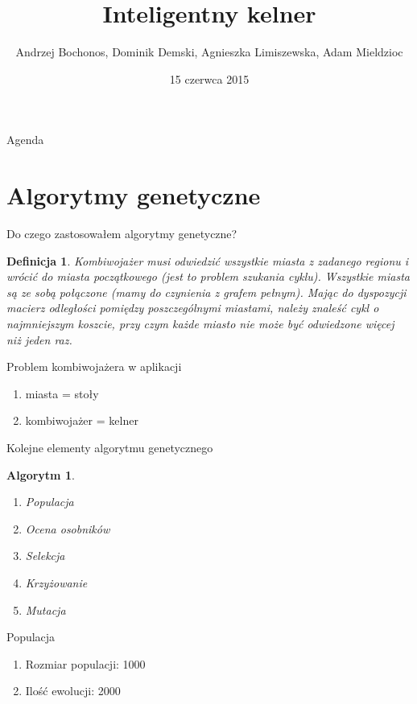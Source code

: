 \documentclass[a4paper,10pt]{beamer}
\date{15 czerwca 2015}
\title{Inteligentny kelner}
\author{Andrzej Bochonos, Dominik Demski, Agnieszka Limiszewska, Adam Mieldzioc}
\newtheorem{defi}{Definicja}[subsection]
\newtheorem{alg}{Algorytm}[subsection]
\begin{document}
		\begin{frame}
			\titlepage
		\end{frame}
		\begin{frame}{Agenda}
			\tableofcontents
		\end{frame}
		
		\section{Algorytmy genetyczne}
		\begin{frame}{Do czego zastosowałem algorytmy genetyczne?}
			\begin{defi}
				Kombiwojażer musi odwiedzić wszystkie miasta z zadanego regionu i wrócić do miasta początkowego (jest to problem szukania cyklu). Wszystkie miasta są ze sobą połączone (mamy do czynienia z grafem pełnym). Mając do dyspozycji macierz odległości pomiędzy poszczególnymi miastami, należy znaleść cykl o najmniejszym koszcie, przy czym każde miasto nie może być odwiedzone więcej niż jeden raz.
			\end{defi}
			
		\end{frame}
		\begin{frame}{Problem kombiwojażera w aplikacji}
			\begin{enumerate}
				\item miasta = stoły
				\item kombiwojażer = kelner
			\end{enumerate}
		\end{frame}
		\begin{frame}{Kolejne elementy algorytmu genetycznego}
			\begin{alg}
				\begin{enumerate}
					\item Populacja
					\item Ocena osobników
					\item Selekcja
					\item Krzyżowanie
					\item Mutacja
				\end{enumerate}
			\end{alg}
		\end{frame}
		\begin{frame}{Populacja}
			\begin{enumerate}
				\item Rozmiar populacji: 1000
				\item Ilość ewolucji: 2000
			\end{enumerate}
		\end{frame}
\end{document}
